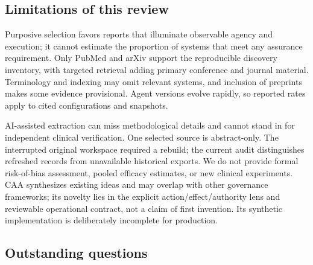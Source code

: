 \subsection{Limitations of this review}
Purposive selection favors reports that illuminate observable agency and execution; it cannot estimate the proportion of systems that meet any assurance requirement. Only PubMed and arXiv support the reproducible discovery inventory, with targeted retrieval adding primary conference and journal material. Terminology and indexing may omit relevant systems, and inclusion of preprints makes some evidence provisional. Agent versions evolve rapidly, so reported rates apply to cited configurations and snapshots.

AI-assisted extraction can miss methodological details and cannot stand in for independent clinical verification. One selected source is abstract-only. The interrupted original workspace required a rebuild; the current audit distinguishes refreshed records from unavailable historical exports. We do not provide formal risk-of-bias assessment, pooled efficacy estimates, or new clinical experiments. CAA synthesizes existing ideas and may overlap with other governance frameworks; its novelty lies in the explicit action/effect/authority lens and reviewable operational contract, not a claim of first invention. Its synthetic implementation is deliberately incomplete for production.

\subsection{Outstanding questions}
\noindent{}
